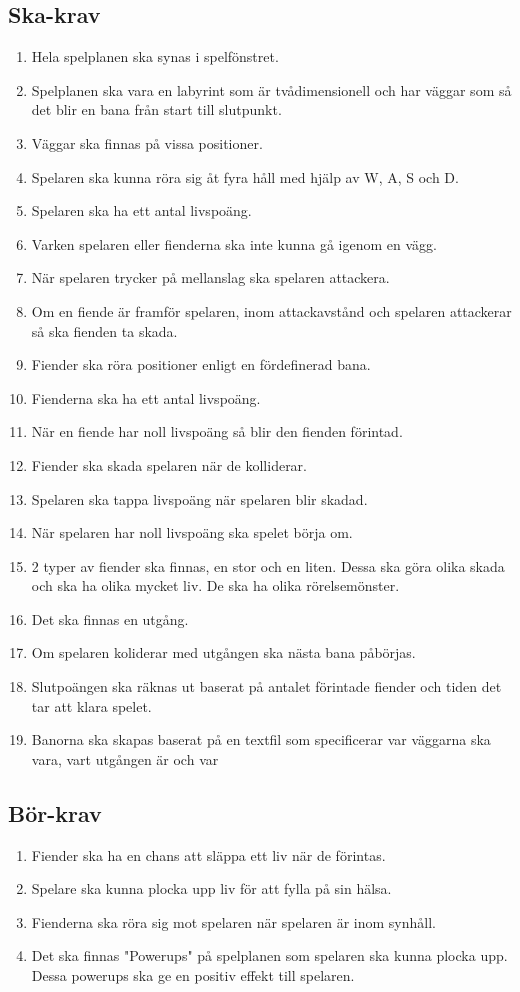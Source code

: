 \documentclass{TDP005mall}
\begin{document}
\subsection{Ska-krav}
\begin{enumerate}
  \item Hela spelplanen ska synas i spelfönstret.
  \item Spelplanen ska vara en labyrint som är tvådimensionell och har väggar som så det blir en bana från start till slutpunkt.
  \item Väggar ska finnas på vissa positioner.
  \item Spelaren ska kunna röra sig åt fyra håll med hjälp av W, A, S och D.
  \item Spelaren ska ha ett antal livspoäng.
  \item Varken spelaren eller fienderna ska inte kunna gå igenom en vägg.
  \item När spelaren trycker på mellanslag ska spelaren attackera.
  \item Om en fiende är framför spelaren, inom attackavstånd och spelaren attackerar så ska fienden ta skada.
  \item Fiender ska röra positioner enligt en fördefinerad bana.
  \item Fienderna ska ha ett antal livspoäng.
  \item När en fiende har noll livspoäng så blir den fienden förintad.
  \item Fiender ska skada spelaren när de kolliderar.
  \item Spelaren ska tappa livspoäng när spelaren blir skadad.
  \item När spelaren har noll livspoäng ska spelet börja om.
  \item 2 typer av fiender ska finnas, en stor och en liten. Dessa ska göra olika skada och ska ha olika mycket liv. De ska ha olika rörelsemönster.
  \item Det ska finnas en utgång.
  \item Om spelaren koliderar med utgången ska nästa bana påbörjas.
  \item Slutpoängen ska räknas ut baserat på antalet förintade fiender och tiden det tar att klara spelet.
  \item Banorna ska skapas baserat på en textfil som specificerar var väggarna ska vara, vart utgången är och var 
\end{enumerate}

\subsection{Bör-krav}
\begin{enumerate}
  \item Fiender ska ha en chans att släppa ett liv när de förintas.
  \item Spelare ska kunna plocka upp liv för att fylla på sin hälsa.
  \item Fienderna ska röra sig mot spelaren när spelaren är inom synhåll.
  \item Det ska finnas "Powerups" på spelplanen som spelaren ska kunna plocka upp. Dessa powerups ska ge en positiv effekt till spelaren.
\end{enumerate}
\end{document}
